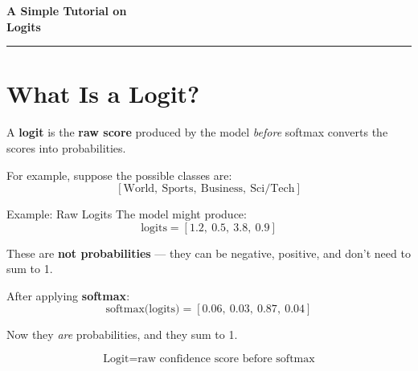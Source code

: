 \documentclass[11pt]{article}
\begin{document}
\begin{center}
  {\Huge\bfseries\color{deepblue} A Simple Tutorial on\\[2pt] Logits}\\[4pt]
  {\color{accent}\rule{0.4\linewidth}{1pt}}
\end{center}
\vspace{10pt}

\section*{What Is a Logit?}

A \textbf{logit} is the \textbf{raw score} produced by the model \emph{before} softmax converts the scores into probabilities.

For example, suppose the possible classes are:
\[
[\text{World},\ \text{Sports},\ \text{Business},\ \text{Sci/Tech}]
\]

\begin{stepbox}{Example: Raw Logits}
The model might produce:
\[
\text{logits} = [1.2,\ 0.5,\ 3.8,\ 0.9]
\]

These are \textbf{not probabilities} --- they can be negative, positive, and don't need to sum to 1.

After applying \textbf{softmax}:
\[
\text{softmax(logits)} = [0.06,\ 0.03,\ 0.87,\ 0.04]
\]

Now they \emph{are} probabilities, and they sum to 1.
\end{stepbox}

\[
\boxed{\text{Logit} = \text{raw confidence score before softmax}}
\]
\end{document}
